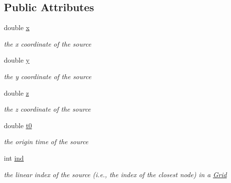 \subsection*{Public Attributes}
\begin{DoxyCompactItemize}
\item 
\hypertarget{classlocations_1_1_location_a23a429a4f5fb78c5c9652576791cc57c}{}double \hyperlink{classlocations_1_1_location_a23a429a4f5fb78c5c9652576791cc57c}{x}\label{classlocations_1_1_location_a23a429a4f5fb78c5c9652576791cc57c}

\begin{DoxyCompactList}\small\item\em the x coordinate of the source \end{DoxyCompactList}\item 
\hypertarget{classlocations_1_1_location_a2bfbc1a3d9f6e47909d4616052380ef1}{}double \hyperlink{classlocations_1_1_location_a2bfbc1a3d9f6e47909d4616052380ef1}{y}\label{classlocations_1_1_location_a2bfbc1a3d9f6e47909d4616052380ef1}

\begin{DoxyCompactList}\small\item\em the y coordinate of the source \end{DoxyCompactList}\item 
\hypertarget{classlocations_1_1_location_a10ed18a2d5818e1ff1e5dc20e7855c12}{}double \hyperlink{classlocations_1_1_location_a10ed18a2d5818e1ff1e5dc20e7855c12}{z}\label{classlocations_1_1_location_a10ed18a2d5818e1ff1e5dc20e7855c12}

\begin{DoxyCompactList}\small\item\em the z coordinate of the source \end{DoxyCompactList}\item 
\hypertarget{classlocations_1_1_location_a95df6ae5910144a54d50fef60beff6f6}{}double \hyperlink{classlocations_1_1_location_a95df6ae5910144a54d50fef60beff6f6}{t0}\label{classlocations_1_1_location_a95df6ae5910144a54d50fef60beff6f6}

\begin{DoxyCompactList}\small\item\em the origin time of the source \end{DoxyCompactList}\item 
\hypertarget{classlocations_1_1_location_a6cef9006891e9e3bdd15fb7ff0a458f3}{}int \hyperlink{classlocations_1_1_location_a6cef9006891e9e3bdd15fb7ff0a458f3}{ind}\label{classlocations_1_1_location_a6cef9006891e9e3bdd15fb7ff0a458f3}

\begin{DoxyCompactList}\small\item\em the linear index of the source (i.\+e., the index of the closest node) in a \hyperlink{class_grid}{Grid} \end{DoxyCompactList}\end{DoxyCompactItemize}


